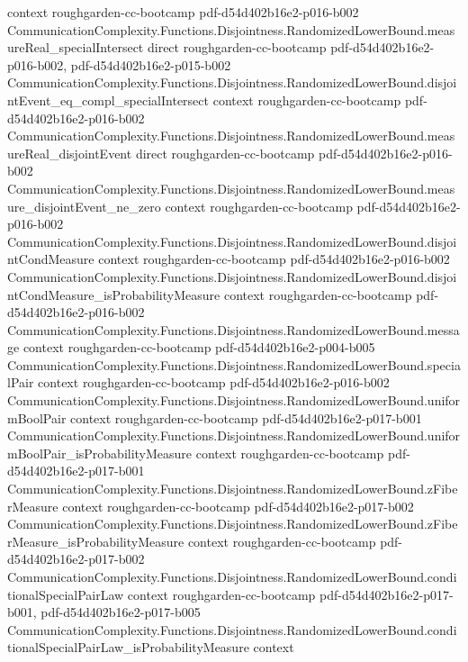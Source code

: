 \begin{theorem}
  {context}
  {roughgarden-cc-bootcamp}
  {pdf-d54d402b16e2-p016-b002}
\proofstep
  {CommunicationComplexity.Functions.Disjointness.RandomizedLowerBound.measureReal_specialIntersect}
  {direct}
  {roughgarden-cc-bootcamp}
  {pdf-d54d402b16e2-p016-b002,
    pdf-d54d402b16e2-p015-b002}
\proofstep
  {CommunicationComplexity.Functions.Disjointness.RandomizedLowerBound.disjointEvent_eq_compl_specialIntersect}
  {context}
  {roughgarden-cc-bootcamp}
  {pdf-d54d402b16e2-p016-b002}
\proofstep
  {CommunicationComplexity.Functions.Disjointness.RandomizedLowerBound.measureReal_disjointEvent}
  {direct}
  {roughgarden-cc-bootcamp}
  {pdf-d54d402b16e2-p016-b002}
\proofstep
  {CommunicationComplexity.Functions.Disjointness.RandomizedLowerBound.measure_disjointEvent_ne_zero}
  {context}
  {roughgarden-cc-bootcamp}
  {pdf-d54d402b16e2-p016-b002}
\proofstep
  {CommunicationComplexity.Functions.Disjointness.RandomizedLowerBound.disjointCondMeasure}
  {context}
  {roughgarden-cc-bootcamp}
  {pdf-d54d402b16e2-p016-b002}
\proofstep
  {CommunicationComplexity.Functions.Disjointness.RandomizedLowerBound.disjointCondMeasure_isProbabilityMeasure}
  {context}
  {roughgarden-cc-bootcamp}
  {pdf-d54d402b16e2-p016-b002}
\proofstep
  {CommunicationComplexity.Functions.Disjointness.RandomizedLowerBound.message}
  {context}
  {roughgarden-cc-bootcamp}
  {pdf-d54d402b16e2-p004-b005}
\proofstep
  {CommunicationComplexity.Functions.Disjointness.RandomizedLowerBound.specialPair}
  {context}
  {roughgarden-cc-bootcamp}
  {pdf-d54d402b16e2-p016-b002}
\proofstep
  {CommunicationComplexity.Functions.Disjointness.RandomizedLowerBound.uniformBoolPair}
  {context}
  {roughgarden-cc-bootcamp}
  {pdf-d54d402b16e2-p017-b001}
\proofstep
  {CommunicationComplexity.Functions.Disjointness.RandomizedLowerBound.uniformBoolPair_isProbabilityMeasure}
  {context}
  {roughgarden-cc-bootcamp}
  {pdf-d54d402b16e2-p017-b001}
\proofstep
  {CommunicationComplexity.Functions.Disjointness.RandomizedLowerBound.zFiberMeasure}
  {context}
  {roughgarden-cc-bootcamp}
  {pdf-d54d402b16e2-p017-b002}
\proofstep
  {CommunicationComplexity.Functions.Disjointness.RandomizedLowerBound.zFiberMeasure_isProbabilityMeasure}
  {context}
  {roughgarden-cc-bootcamp}
  {pdf-d54d402b16e2-p017-b002}
\proofstep
  {CommunicationComplexity.Functions.Disjointness.RandomizedLowerBound.conditionalSpecialPairLaw}
  {context}
  {roughgarden-cc-bootcamp}
  {pdf-d54d402b16e2-p017-b001,
    pdf-d54d402b16e2-p017-b005}
\proofstep
  {CommunicationComplexity.Functions.Disjointness.RandomizedLowerBound.conditionalSpecialPairLaw_isProbabilityMeasure}
  {context}

\end{theorem}

